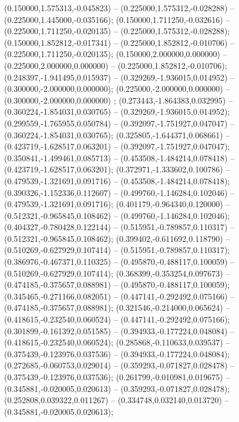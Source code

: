  (0.150000,1.575313,-0.045823) -- (0.225000,1.575312,-0.028288) -- (0.225000,1.445000,-0.035166);
 (0.150000,1.711250,-0.032616) -- (0.225000,1.711250,-0.020135) -- (0.225000,1.575312,-0.028288);
 (0.150000,1.852812,-0.017341) -- (0.225000,1.852812,-0.010706) -- (0.225000,1.711250,-0.020135);
 (0.150000,2.000000,0.000000) -- (0.225000,2.000000,0.000000) -- (0.225000,1.852812,-0.010706);
 (0.248397,-1.941495,0.015937) -- (0.329269,-1.936015,0.014952) -- (0.300000,-2.000000,0.000000);
 (0.225000,-2.000000,0.000000) -- (0.300000,-2.000000,0.000000) ;
 (0.273443,-1.864383,0.032995) -- (0.360224,-1.854031,0.030765) -- (0.329269,-1.936015,0.014952);
 (0.299559,-1.765955,0.050784) -- (0.392097,-1.751927,0.047047) -- (0.360224,-1.854031,0.030765);
 (0.325805,-1.644371,0.068661) -- (0.423719,-1.628517,0.063201) -- (0.392097,-1.751927,0.047047);
 (0.350841,-1.499461,0.085713) -- (0.453508,-1.484214,0.078418) -- (0.423719,-1.628517,0.063201);
 (0.372971,-1.333602,0.100786) -- (0.479539,-1.321691,0.091716) -- (0.453508,-1.484214,0.078418);
 (0.390326,-1.152336,0.112607) -- (0.499760,-1.146284,0.102046) -- (0.479539,-1.321691,0.091716);
 (0.401179,-0.964340,0.120000) -- (0.512321,-0.965845,0.108462) -- (0.499760,-1.146284,0.102046);
 (0.404327,-0.780428,0.122144) -- (0.515951,-0.789857,0.110317) -- (0.512321,-0.965845,0.108462);
 (0.399402,-0.611692,0.118790) -- (0.510269,-0.627929,0.107414) -- (0.515951,-0.789857,0.110317);
 (0.386976,-0.467371,0.110325) -- (0.495870,-0.488117,0.100059) -- (0.510269,-0.627929,0.107414);
 (0.368399,-0.353254,0.097673) -- (0.474185,-0.375657,0.088981) -- (0.495870,-0.488117,0.100059);
 (0.345465,-0.271166,0.082051) -- (0.447141,-0.292492,0.075166) -- (0.474185,-0.375657,0.088981);
 (0.321546,-0.214000,0.065624) -- (0.418615,-0.232540,0.060524) -- (0.447141,-0.292492,0.075166);
 (0.301899,-0.161392,0.051585) -- (0.394933,-0.177224,0.048084) -- (0.418615,-0.232540,0.060524);
 (0.285868,-0.110633,0.039537) -- (0.375439,-0.123976,0.037536) -- (0.394933,-0.177224,0.048084);
 (0.272685,-0.060753,0.029014) -- (0.359293,-0.071827,0.028478) -- (0.375439,-0.123976,0.037536);
 (0.261799,-0.010981,0.019675) -- (0.345881,-0.020005,0.020613) -- (0.359293,-0.071827,0.028478);
 (0.252808,0.039322,0.011267) -- (0.334748,0.032140,0.013720) -- (0.345881,-0.020005,0.020613);
